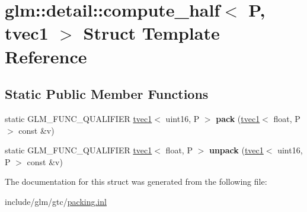\hypertarget{structglm_1_1detail_1_1compute__half_3_01P_00_01tvec1_01_4}{}\section{glm\+:\+:detail\+:\+:compute\+\_\+half$<$ P, tvec1 $>$ Struct Template Reference}
\label{structglm_1_1detail_1_1compute__half_3_01P_00_01tvec1_01_4}
\subsection*{Static Public Member Functions}
\begin{DoxyCompactItemize}
\item 
\mbox{\label{structglm_1_1detail_1_1compute__half_3_01P_00_01tvec1_01_4_a9a68b199364fc66de210ca1de0d2242b}} 
static G\+L\+M\+\_\+\+F\+U\+N\+C\+\_\+\+Q\+U\+A\+L\+I\+F\+I\+ER \hyperlink{structglm_1_1tvec1}{tvec1}$<$ uint16, P $>$ {\bfseries pack} (\hyperlink{structglm_1_1tvec1}{tvec1}$<$ float, P $>$ const \&v)
\item 
\mbox{\label{structglm_1_1detail_1_1compute__half_3_01P_00_01tvec1_01_4_a92e6b667d1d28ae167b9df692c805afd}} 
static G\+L\+M\+\_\+\+F\+U\+N\+C\+\_\+\+Q\+U\+A\+L\+I\+F\+I\+ER \hyperlink{structglm_1_1tvec1}{tvec1}$<$ float, P $>$ {\bfseries unpack} (\hyperlink{structglm_1_1tvec1}{tvec1}$<$ uint16, P $>$ const \&v)
\end{DoxyCompactItemize}


The documentation for this struct was generated from the following file\+:\begin{DoxyCompactItemize}
\item 
include/glm/gtc/\hyperlink{packing_8inl}{packing.\+inl}\end{DoxyCompactItemize}
